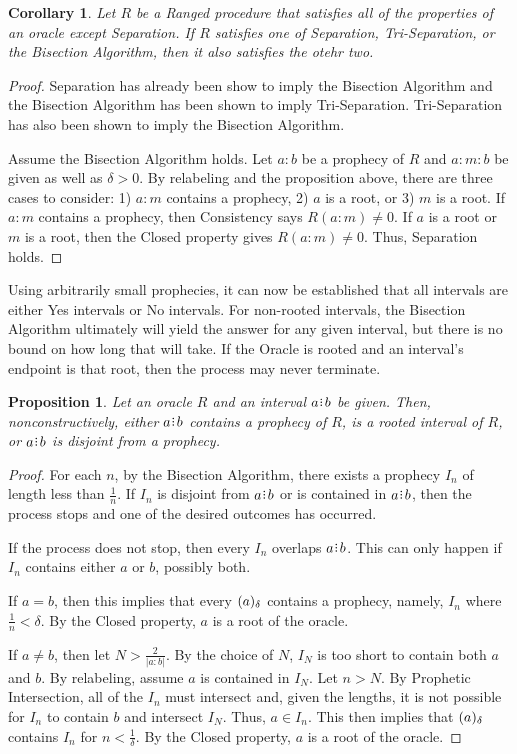\documentclass[12pt]{article}
\newtheorem{corollary}{Corollary}[section]
\newtheorem{proposition}{Proposition}[section]
\begin{document}
\begin{corollary}
    Let $R$ be a Ranged procedure that satisfies all of the properties of an oracle except Separation. If $R$ satisfies one of Separation, Tri-Separation, or the Bisection Algorithm, then it also satisfies the otehr two. 
\end{corollary}

\begin{proof}
    Separation has already been show to imply the Bisection Algorithm and the Bisection Algorithm has been shown to imply Tri-Separation. Tri-Separation has also been shown to imply the Bisection Algorithm. 

    Assume the Bisection Algorithm holds. Let $a:b$ be a prophecy of $R$ and $a:m:b$ be given as well as $\delta > 0$. By relabeling and the proposition above, there are three cases to consider: 1) $a:m$ contains a prophecy, 2) $a$ is a root, or 3) $m$ is a root. If $a:m$ contains a prophecy, then Consistency says $R(a:m) \neq 0$. If $a$ is a root or $m$ is a root, then the Closed property gives $R(a:m) \neq 0$. Thus, Separation holds. 
\end{proof}


Using arbitrarily small prophecies, it can now be established that all intervals are either Yes intervals or No intervals. For non-rooted intervals, the Bisection Algorithm ultimately will yield the answer for any given interval, but there is no bound on how long that will take. If the Oracle is rooted and an interval's endpoint is that root, then the process may never terminate.

\begin{proposition}
    Let an oracle $R$ and an interval $a \rint b$ be given. Then, nonconstructively, either $a \rint b$ contains a prophecy of $R$, is a rooted interval of $R$, or $a \rint b$ is disjoint from a prophecy. 
\end{proposition}

\begin{proof}
    For each $n$, by the Bisection Algorithm, there exists a prophecy $I_n$ of length less than $\frac{1}{n}$. If $I_n$ is disjoint from $a \rint b$ or is contained in $a \rint b$, then the process stops and one of the desired outcomes has occurred. 

    If the process does not stop, then every $I_n$ overlaps $a \rint b$. This can only happen if $I_n$ contains either $a$ or $b$, possibly both. 
    
    If $a = b$, then this implies that every $(a)_{\delta}$ contains a prophecy, namely, $I_n$ where $\frac{1}{n} < \delta$. By the Closed property, $a$ is a root of the oracle. 

    If $a \neq b$, then let $N > \frac{2}{|a:b|}$. By the choice of $N$, $I_N$ is too short to contain both $a$ and $b$. By relabeling, assume $a$ is contained in $I_N$. Let $n > N$. By Prophetic Intersection, all of the $I_n$ must intersect and, given the lengths, it is not possible for $I_n$ to contain $b$ and intersect $I_N$. Thus, $a \in I_n$. This then implies that $(a)_{\delta}$ contains $I_n$ for $n < \frac{1}{\delta}$. By the Closed property, $a$ is a root of the oracle. 
\end{proof}
\end{document}

